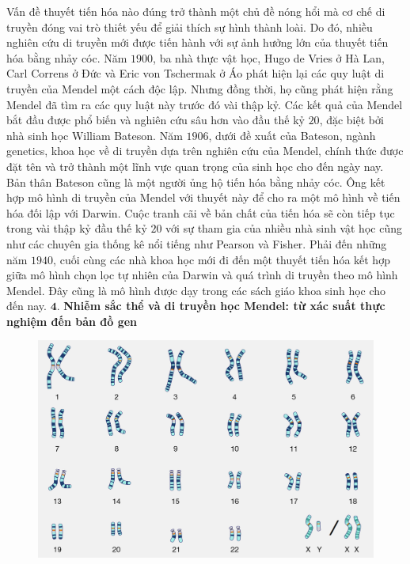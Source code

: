 \begin{multicols}{2}
	\vskip 0.1cm
	Vấn đề thuyết tiến hóa nào đúng trở thành một chủ đề nóng hổi mà cơ chế di truyền đóng vai trò thiết yếu để giải thích sự hình thành loài. Do đó, nhiều nghiên cứu di truyền mới được tiến hành với sự ảnh hưởng lớn của thuyết tiến hóa bằng nhảy cóc. Năm $1900$, ba nhà thực vật học, Hugo de Vries ở Hà Lan, Carl Correns ở Đức và Eric von Tschermak ở Áo phát hiện lại các quy luật di truyền của Mendel một cách độc lập. Nhưng đồng thời, họ cũng phát hiện rằng Mendel đã tìm ra các quy luật này trước đó vài thập kỷ. Các kết quả của Mendel bắt đầu được phổ biến và nghiên cứu sâu hơn vào đầu thế kỷ $20$, đặc biệt bởi nhà sinh học William Bateson. Năm $1906$, dưới đề xuất của Bateson, ngành genetics, khoa học về di truyền dựa trên nghiên cứu của Mendel, chính thức được đặt tên và trở thành một lĩnh vực quan trọng của sinh học cho đến ngày nay.
	\vskip 0.1cm
	Bản thân Bateson cũng là một người ủng hộ tiến hóa bằng nhảy cóc. Ông kết hợp mô hình di truyền của Mendel với thuyết này để cho ra một mô hình về tiến hóa đối lập với Darwin. Cuộc tranh cãi về bản chất của tiến hóa sẽ còn tiếp tục trong vài thập kỷ đầu thế kỷ $20$ với sự tham gia của nhiều nhà sinh vật học cũng như các chuyên gia thống kê nổi tiếng như Pearson và Fisher. Phải đến những năm $1940$, cuối cùng các nhà khoa học mới đi đến một thuyết tiến hóa kết hợp giữa  mô hình chọn lọc tự nhiên của Darwin và quá trình di truyền theo mô hình Mendel. Đây cũng là mô hình được dạy trong các sách giáo khoa sinh học cho đến nay.
	\vskip 0.1cm
	$\pmb{4.}$ \textbf{\color{timhieukhoahoc}Nhiễm sắc thể và di truyền học Mendel: từ xác suất thực nghiệm đến bản đồ gen}
	\begin{figure}[H]
		\centering
		\vspace*{-5pt}
		\captionsetup{labelformat= empty, justification=centering}
		\includegraphics[width=1\linewidth]{image004}

\end{figure}
\end{multicols}
